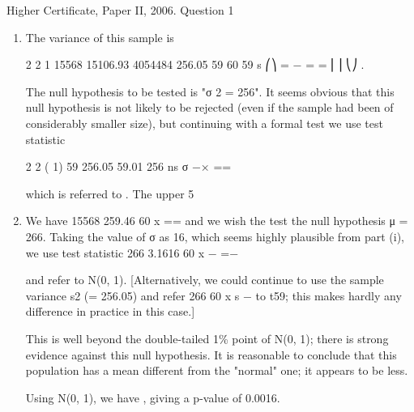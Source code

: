 \documentclass[a4paper,12pt]{article}
\begin{document}
Higher Certificate, Paper II, 2006.  Question 1 
 
 \begin{enumerate}
\item The variance of this sample is 
 
2 2 1 15568 15106.93 4054484 256.05 59 60 59
s
⎛⎞ = − = = ⎜⎟ ⎝⎠ . 
 
The null hypothesis to be tested is "σ 2 = 256".  It seems obvious that this null hypothesis is not likely to be rejected (even if the sample had been of considerably smaller size), but continuing with a formal test we use test statistic 
 
2
2 ( 1) 59 256.05 59.01 256 ns σ −× ==
 
 
which is referred to .  The upper 5%
 
 
\item We have  15568 259.46 60 x ==  and we wish the test the null hypothesis μ = 266.  Taking the value of σ as 16, which seems highly plausible from part (i), we use test statistic 
 266 3.1616 60 x − =− 
 
and refer to N(0, 1). 
 [Alternatively, we could continue to use the sample variance s2 (= 256.05) and refer 266 60 x s − to t59;  this makes hardly any difference in practice in this case.] 
 
This is well beyond the double-tailed 1\% point of N(0, 1);  there is strong evidence against this null hypothesis.  It is reasonable to conclude that this population has a mean different from the "normal" one;  it appears to be less. 
 
Using N(0, 1), we have , giving a p-value of 0.0016. 
\end{enumerate}
\end{document}
